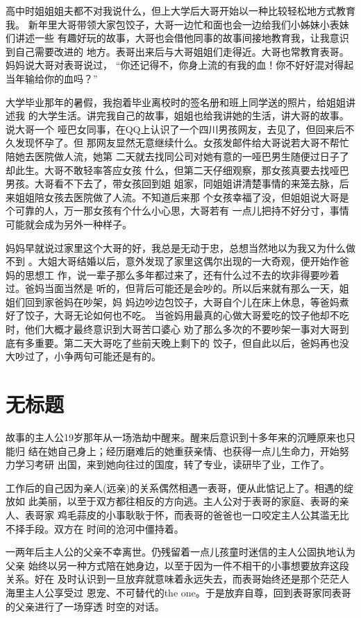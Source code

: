 \documentclass[12pt]{book}
\begin{document}
高中时姐姐姐夫都不对我说什么，但上大学后大哥开始以一种比较轻松地方式教育我。
新年里大哥带领大家包饺子，大哥一边忙和面也会一边给我们小姊妹小表妹们讲述一些
有趣好玩的故事，大哥也会借他同事的故事间接地教育我，让我意识到自己需要改进的
地方。表哥出来后与大哥姐姐们走得近。大哥也常教育表哥。妈妈说大哥对表哥说过，
“你还记得不，你身上流的有我的血！你不好好混对得起当年输给你的血吗？”

大学毕业那年的暑假，我抱着毕业离校时的签名册和班上同学送的照片，给姐姐讲述我
的大学生活。讲完我自己的故事，姐姐也给我讲她的生活，讲大哥的故事。说大哥一个
哑巴女同事，在QQ上认识了一个四川男孩网友，去见了，但回来后不久发现怀孕了。但
那网友显然无意继续什么。女孩发邮件给大哥说若大哥不帮忙陪她去医院做人流，她第
二天就去找同公司对她有意的一哑巴男生随便过日子了却此生。大哥不敢轻率答应女孩
什么，但第二天仔细观察，那女孩真要去找哑巴男孩。大哥看不下去了，带女孩回到姐
姐家，同姐姐讲清楚事情的来笼去脉，后来姐姐陪女孩去医院做了人流。不知道后来那
个女孩幸福了没，但姐姐说大哥是个可靠的人，万一那女孩有个什么小心思，大哥若有
一点儿把持不好分寸，事情可能就会成为另外一种样子。

妈妈早就说过家里这个大哥的好，我总是无动于忠，总想当然地以为我又为什么做不到
。大姐大哥结婚以后，意外发现了家里这偶尔出现的一大奇观，便开始作爸妈的思想工
作，说一辈子那么多年都过来了，还有什么过不去的坎非得要吵着过。爸妈当面当然是
听的，但背后可能还是会吵的。所以后来就有那么一天，姐姐们回到家爸妈在吵架，妈
妈边吵边包饺子，大哥自个儿在床上休息，等爸妈煮好了饺子，大哥无论如何也不吃。
当爸妈用最真的心做大哥爱吃的饺子他却不吃时，他们大概才最终意识到大哥苦口婆心
劝了那么多次的不要吵架一事对大哥到底有多重要。第二天大哥吃了些前天晚上剩下的
饺子，但自此以后，爸妈再也没大吵过了，小争两句可能还是有的。
\section{无标题}
\label{sec-9-36}
故事的主人公19岁那年从一场浩劫中醒来。醒来后意识到十多年来的沉睡原来也只能归
结在她自己身上；经历磨难后的她重获亲情、也获得一点儿生命力，开始努力学习考研
出国，来到她向往过的国度，转了专业，读研毕了业，工作了。

工作后的自己因为亲人(远亲)的关系偶然相遇一表哥，便从此惦记上了。相遇的绽放如
此美丽，以至于双方都往相反的方向逃。主人公对于表哥的家庭、表哥的亲人、表哥家
鸡毛蒜皮的小事耿耿于怀，而表哥的爸爸也一口咬定主人公其滥无比不择手段。双方在
时间的沧河中僵持着。

一两年后主人公的父亲不幸离世。仍残留着一点儿孩童时迷信的主人公固执地认为父亲
始终以另一种方式陪在她身边，以至于因为一件不相干的小事想要放弃这段关系。好在
及时认识到一旦放弃就意味着永远失去，而表哥始终还是那个茫茫人海里主人公享受过
恩宠、不可替代的the one。于是放弃自尊，回到表哥家同表哥的父亲进行了一场穿透
时空的对话。
\end{document}
